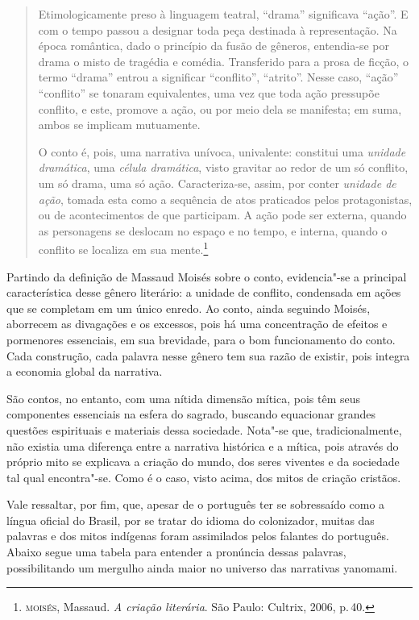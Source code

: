\begin{quote}
Etimologicamente preso à linguagem teatral,
``drama'' significava ``ação''. E com o tempo passou a designar
toda peça destinada à representação. Na época romântica, dado o
princípio da fusão de gêneros, entendia-se por drama o misto de
tragédia e comédia. Transferido para a prosa de ficção, o termo
``drama'' entrou a significar ``conflito'', ``atrito''. Nesse caso,
``ação'' ``conflito'' se tonaram equivalentes, uma vez que toda
ação pressupõe conflito, e este, promove a ação, ou por meio dela
se manifesta; em suma, ambos se implicam mutuamente.

O conto é, pois, uma narrativa unívoca, univalente: constitui
uma \textit{unidade dramática}, uma \textit{célula dramática}, visto gravitar ao
redor de um só conflito, um só drama, uma só ação. Caracteriza-se,
assim, por conter \textit{unidade de ação}, tomada esta como a sequência de atos praticados pelos protagonistas, ou de acontecimentos de
que participam. A ação pode ser externa, quando as personagens se
deslocam no espaço e no tempo, e interna, quando o conflito se
localiza em sua mente.\footnote{\textsc{moisés}, Massaud. \textit{A criação literária}. São Paulo: Cultrix, 2006, p.\,40.}
\end{quote}

Partindo da definição de Massaud Moisés sobre o conto, evidencia"-se a principal característica desse gênero literário: a unidade de conflito, condensada em ações que se completam em um único enredo. Ao conto, ainda seguindo Moisés, aborrecem as divagações e os excessos, pois há uma concentração de efeitos e pormenores essenciais, em sua brevidade, para o bom funcionamento do conto.
Cada construção, cada palavra nesse gênero tem sua razão de existir, pois integra a economia global da narrativa.

São contos, no entanto, com uma nítida dimensão mítica, pois têm
seus componentes essenciais na esfera do sagrado, buscando equacionar
grandes questões espirituais e materiais dessa sociedade.
Nota"-se que, tradicionalmente, não existia uma diferença entre a narrativa histórica e a mítica, pois através do próprio mito se explicava a criação do mundo, dos seres viventes e da sociedade tal qual encontra"-se.
Como é o caso, visto acima, dos mitos de criação cristãos.

Vale ressaltar, por fim, que, apesar de o português ter se sobressaído como a língua oficial do Brasil, por se tratar do idioma do colonizador, muitas das palavras e dos mitos indígenas foram assimilados pelos falantes do português.
Abaixo segue uma tabela para entender a pronúncia dessas palavras, possibilitando um mergulho ainda maior no universo das narrativas yanomami.

